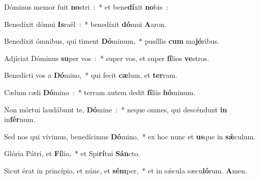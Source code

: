\item Dóminus memor fuit \textbf{no}\-stri~:~* et bene\textbf{dí}\-xit \textbf{no}bis~:
\item Benedíxit dómui \textbf{Is}\-raël~:~* benedíxit \textbf{dó}\-mui \textbf{A}aron.
\item Benedíxit ómnibus, qui timent \textbf{Dó}\-minum,~* pu\-síl\-lis \textbf{cum} ma\textbf{jó}ribus.
\item Adjíciat Dóminus \textbf{su}\-per vos~:~* super vos, et super \textbf{fí}\-li\-os \textbf{ve}stros.
\item Benedícti vos a \textbf{Dó}\-mino,~* qui fecit \textbf{cæ}\-lum, et \textbf{ter}ram.
\item Cælum cæli \textbf{Dó}\-mino~:~* terram autem dedit \textbf{fí}\-liis \textbf{hó}minum.
\item Non mórtui laudábunt te, \textbf{Dó}\-mine~:~* neque omnes, qui descéndunt \textbf{in} in\textbf{fér}num.
\item Sed nos qui vívimus, benedícimus \textbf{Dó}\-mino,~* ex hoc nunc et \textbf{us}\-que in \textbf{sǽ}culum.
\item Glória Pátri, et \textbf{Fí}\-lio,~* et Spi\textbf{rí}\-tui \textbf{Sán}cto.
\item Sicut érat in princípio, et núnc, et \textbf{sém}\-per,~* et in sǽcula sæcu\textbf{ló}\-rum. \textbf{A}men.